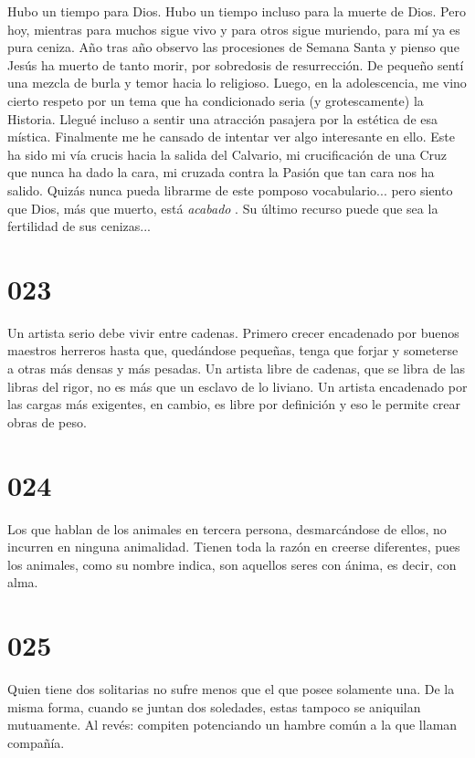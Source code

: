 \documentclass[a4paper,11pt,openright,twocolumn]{book}
\begin{document}
Hubo un tiempo para Dios. Hubo un tiempo incluso para la muerte de Dios. Pero hoy, mientras para muchos sigue vivo y para otros sigue muriendo, para mí ya es pura ceniza. Año tras año observo las procesiones de Semana Santa y pienso que Jesús ha muerto de tanto morir, por sobredosis de resurrección. De pequeño sentí una mezcla de burla y temor hacia lo religioso. Luego, en la adolescencia, me vino cierto respeto por un tema que ha condicionado seria (y grotescamente) la Historia. Llegué incluso a sentir una atracción pasajera por la estética de esa mística. Finalmente me he cansado de intentar ver algo interesante en ello. Este ha sido mi vía crucis hacia la salida del Calvario, mi crucificación de una Cruz que nunca ha dado la cara, mi cruzada contra la Pasión que tan cara nos ha salido. Quizás nunca pueda librarme de este pomposo vocabulario... pero siento que Dios, más que muerto, está {\it acabado}  . Su último recurso puede que sea la fertilidad de sus cenizas...

\section*{023}

Un artista serio debe vivir entre cadenas. Primero crecer encadenado por buenos maestros herreros hasta que, quedándose pequeñas, tenga que forjar y someterse a otras más densas y más pesadas. Un artista libre de cadenas, que se libra de las libras del rigor, no es más que un esclavo de lo liviano. Un artista encadenado por las cargas más exigentes, en cambio, es libre por definición y eso le permite crear obras de peso.

\section*{024}

Los que hablan de los animales en tercera persona, desmarcándose de ellos, no incurren en ninguna animalidad. Tienen toda la razón en creerse diferentes, pues los animales, como su nombre indica, son aquellos seres con ánima, es decir, con alma. 

\section*{025}

Quien tiene dos solitarias no sufre menos que el que posee solamente una. De la misma forma, cuando se juntan dos soledades, estas tampoco se aniquilan mutuamente. Al revés: compiten potenciando un hambre común a la que llaman compañía.
\end{document}
